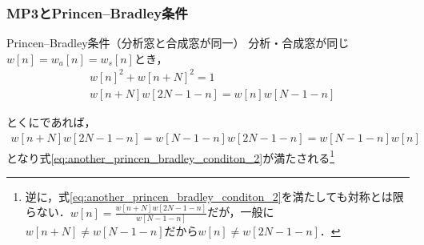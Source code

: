 \documentclass[14pt,xcolor=dvipsnames,table,dvipdfmx]{beamer}
\begin{document}
\begin{frame}[c]
    \frametitle{MP3とPrincen--Bradley条件}
    \begin{block}{Princen--Bradley条件（分析窓と合成窓が同一）}
        分析・合成窓が同じ$w[n] = w_{a}[n] = w_{s}[n]$とき，
        \begin{align}
            & w[n]^{2} + w[n + N]^{2} = 1 \label{eq:another_princen_bradley_conditon_1} \\
            & w[n + N] w[2N - 1 - n] = w[n]w[N - 1 - n] \label{eq:another_princen_bradley_conditon_2}
        \end{align}
    \end{block}
    とくにであれば，
    \footnotesize
    \begin{align*}
        w[n + N] w[2N - 1 - n] = w[N - 1 - n]w[2N - 1 - n] = w[N - 1 - n]w[n]
    \end{align*}
    \normalsize
    となり式\eqref{eq:another_princen_bradley_conditon_2}が満たされる\footnote{逆に，式\eqref{eq:another_princen_bradley_conditon_2}を満たしても対称とは限らない．$w[n] = \frac{w[n + N]w[2N - 1 - n]}{w[N - 1 - n]}$だが，一般に$w[n + N] \neq w[N - 1 - n]$だから$w[n] \neq w[2N - 1 - n]$．}
\end{frame}
\end{document}
